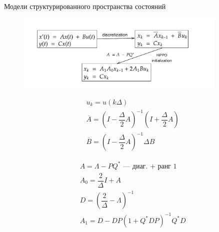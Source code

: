 \documentclass[10pt,pdf,hyperref={unicode}]{beamer}
\begin{document}
\begin{frame}{Модели структурированного пространства состояний}
	\begin{figure}
		\includegraphics[width=0.9\textwidth]{s4-diagram.pdf}
	\end{figure}

	\begin{multicols}{2}
		\begin{align*}
			&u_k = u(k\Delta) \\
			&\overline{A} = (I - \dfrac{\Delta}{2} A)^{-1} (I + \dfrac{\Delta}{2} A) \\
			&\overline{B} = (I - \dfrac{\Delta}{2} A)^{-1} \Delta B
		\end{align*}
	
		\begin{align*}
			&A = \Lambda - PQ^* \text{~--- диаг. + ранг 1}\\
			&A_0 = \dfrac{2}{\Delta} I + A \\
			&D = (\dfrac{2}{\Delta} - \Lambda)^{-1} \\
			&A_1 = D - DP(1 + Q^*DP)^{-1}Q^*D
		\end{align*}
	\end{multicols}
\end{frame}
\end{document}
